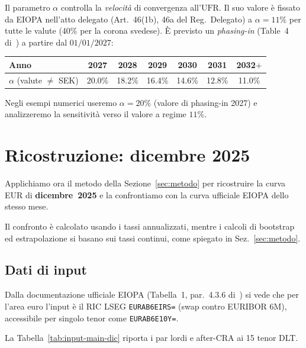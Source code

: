 \documentclass[11pt,a4paper]{article}
\theoremstyle{plain}
\theoremstyle{definition}
\theoremstyle{remark}
\newcommand{\UFR}{\mathrm{UFR}}
\begin{document}
Il parametro $\alpha$ controlla la \emph{velocit\`a} di convergenza all'$\UFR$. Il suo valore \`e fissato
da EIOPA nell'atto delegato (Art.~46(1b), 46a del Reg.~Delegato) a $\alpha=11\%$ per tutte le valute ($40\%$ per
la corona svedese). \`E previsto un \emph{phasing-in} (Table~4 di~\cite{eiopa2026}) a partire
dal $01/01/2027$:
\begin{center}\small
\renewcommand{\arraystretch}{1.15}
\begin{tabular}{lcccccc}
\toprule
Anno & 2027 & 2028 & 2029 & 2030 & 2031 & 2032$+$\\
\midrule
$\alpha$ (valute $\neq$ SEK) & 20.0\% & 18.2\% & 16.4\% & 14.6\% & 12.8\% & 11.0\%\\
\bottomrule
\end{tabular}
\end{center}
Negli esempi numerici useremo $\alpha=20\%$ (valore di phasing-in 2027) e analizzeremo la
sensitivit\`a verso il valore a regime $11\%$.

\section{Ricostruzione: dicembre 2025}
\label{sec:ricostruzione}

Applichiamo ora il metodo della Sezione~\ref{sec:metodo} per ricostruire la curva EUR di
\textbf{dicembre~2025} e la confrontiamo con la curva ufficiale EIOPA dello stesso mese.

Il confronto è calcolato usando i tassi annualizzati, mentre i calcoli di bootstrap ed
estrapolazione si basano sui tassi continui, come spiegato in Sez.~\ref{sec:metodo}.

\subsection{Dati di input}
\label{sec:dati-input-dic}

Dalla documentazione ufficiale EIOPA (Tabella~1, par.~4.3.6 di~\cite{eiopa2026}) si vede che per
l'area euro l'input \`e il RIC LSEG \texttt{EURAB6EIRS=} (swap contro EURIBOR 6M), accessibile per
singolo tenor come \texttt{EURAB6E10Y=}.


La Tabella~\ref{tab:input-main-dic} riporta i par lordi e after-CRA ai 15 tenor DLT. 
\end{document}
